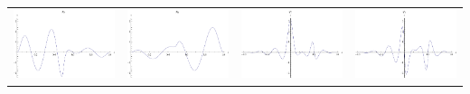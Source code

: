 \documentclass{article}
\begin{document}
\begin{landscape}
\begin{tabular}{cccc}
\includegraphics[width=5.0cm]{sextic_bspline_5.pdf}& \includegraphics[width=5.0cm]{sextic_bspline_6.pdf}& \includegraphics[width=5.0cm]{sextic_bspline_7.pdf}& \includegraphics[width=5.0cm]{sextic_bspline_8.pdf} \\
\end{tabular} 
 \end{landscape}
\end{document}
